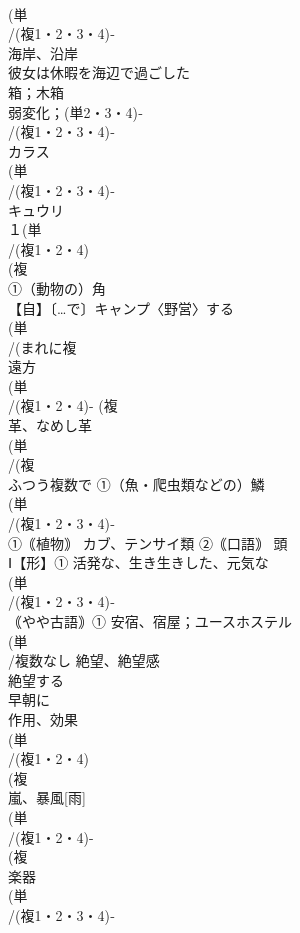 \documentclass[8pt]{extreport}
\begin{document}
\begin{CJK}{UTF8}{min}
\\	(単
\\	/(複1・2・3・4)‐
\\	海岸、沿岸 
\\	彼女は休暇を海辺で過ごした 
\\	箱；木箱
\\	弱変化；(単2・3・4)‐
\\	/(複1・2・3・4)‐
\\	カラス 
\\	(単
\\	/(複1・2・3・4)‐
\\	キュウリ 
\\	１(単
\\	/(複1・2・4)
\\	(複
\\	①（動物の）角 
\\	【自】〔…で〕キャンプ〈野営〉する 
\\	(単
\\	/(まれに複
\\	遠方 
\\	(単
\\	/(複1・2・4)- (複
\\	革、なめし革 
\\	(単
\\	/(複
\\	ふつう複数で ①（魚・爬虫類などの）鱗 
\\	(単
\\	/(複1・2・3・4)‐
\\	①｟植物｠ カブ、テンサイ類 ②｟口語｠ 頭
\\	Ⅰ【形】① 活発な、生き生きした、元気な 
\\	(単
\\	/(複1・2・3・4)‐
\\	｟やや古語｠① 安宿、宿屋；ユースホステル
\\	(単
\\	/複数なし 絶望、絶望感 
\\	絶望する
\\	早朝に
\\	作用、効果 
\\	(単
\\	/(複1・2・4)
\\	(複
\\	嵐、暴風[雨] 
\\	(単
\\	/(複1・2・4)-
\\	(複
\\	楽器
\\	(単
\\	/(複1・2・3・4)‐

\end{CJK}
\end{document}
